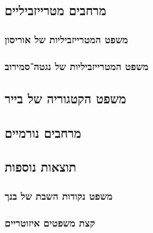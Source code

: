 \documentclass[name=רשימות טופולוגיה כללית]{../../../tex/classes/noChapterMegasumPreamble}
\begin{document}
	\subsection{מרחבים מטרייזביליים}
	\subsubsection{משפט המטרייזביליות של אוריסון}
	\subsubsection{משפט המטרייזביליות של נגטה־סמירוב}
	\subsection{משפט הקטגוריה של בייר}
	\subsection{מרחבים נורמיים}
	\subsection{תוצאות נוספות}
	\subsubsection{משפט נקודות השבת של בנך}
	\subsubsection{קצת משפטים איזוטריים}
	
		
	\ndoc
\end{document}
